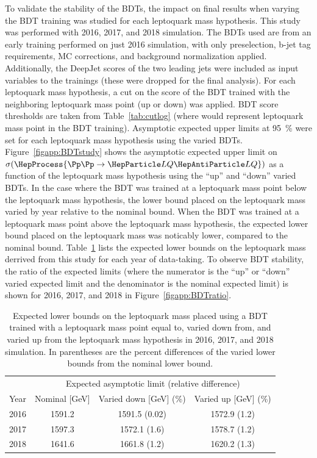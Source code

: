 To validate the stability of the BDTs, the impact on final results when varying the BDT training was studied for each leptoquark mass hypothesis. This study was performed with 2016, 2017, and 2018 simulation. The BDTs used are from an early training performed on just 2016 simulation, with only preselection, b-jet tag requirements, MC corrections, and background normalization applied. Additionally, the DeepJet scores of the two leading jets were included as input variables to the trainings (these were dropped for the final analysis). For each leptoquark mass hypothesis, a cut on the score of the BDT trained with the neighboring leptoquark mass point (up or down) was applied. BDT score thresholds are taken from Table~\ref{tab:cutlog} (where \MLQ would represent leptoquark mass point in the BDT training). Asymptotic expected upper limits at  \SI{95}{\%} \CL were set for each leptoquark mass hypothesis using the varied BDTs. Figure~\ref{figapp:BDTstudy} shows the asymptotic expected upper limit on $\sigma(\HepProcess{\Pp\Pp \to \LQ\LQbar})$ as a function of the leptoquark mass hypothesis using the ``up'' and ``down'' varied BDTs. In the case where the BDT was trained at a leptoquark mass point below the leptoquark mass hypothesis, the lower bound placed on the leptoquark mass varied by year relative to the nominal bound. When the BDT was trained at a leptoquark mass point above the leptoquark mass hypothesis, the expected lower bound placed on the leptoquark mass was noticably lower, compared to the nominal bound. Table~\ref{tab:limitsBDTstudy} lists the expected lower bounds on the leptoquark mass derrived from this study for each year of data-taking. To observe BDT stability, the ratio of the expected limits (where the numerator is the ``up'' or ``down'' varied expected limit and the denominator is the nominal expected limit) is shown for 2016, 2017, and 2018 in Figure~\ref{figapp:BDTratio}.

\begin{table}[htbp]
    \caption{Expected lower bounds on the leptoquark mass placed using a BDT trained with a leptoquark mass point equal to, varied down from, and varied up from the leptoquark mass hypothesis in 2016, 2017, and 2018 simulation. In parentheses are the percent differences of the varied lower bounds from the nominal lower bound.}
    \begin{center}
           \begin{tabular}{cccc}\hline\hline
                        & \multicolumn{3}{c}{Expected asymptotic limit (relative difference)} \\
                Year    & Nominal [GeV] & Varied down [GeV] (\%) & Varied up [GeV] (\%) \\ \hline
                2016    & 1591.2 & 1591.5 (0.02) & 1572.9 (1.2) \\
                2017    & 1597.3 & 1572.1 (1.6) & 1578.7 (1.2) \\
                2018    & 1641.6 & 1661.8 (1.2) & 1620.2 (1.3) \\ \hline\hline
           \end{tabular}
           \label{tab:limitsBDTstudy}
    \end{center}
\end{table}


